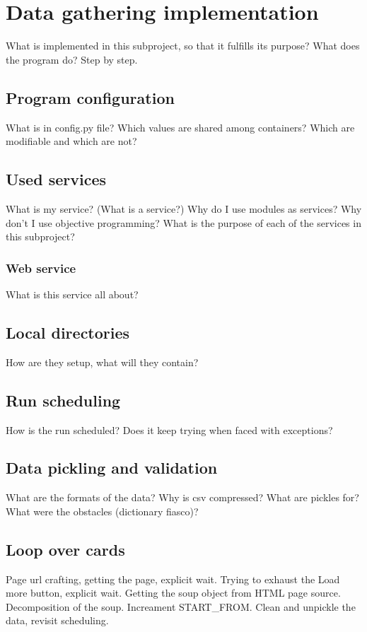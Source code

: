 \chapter{Data gathering implementation}
\label{ch:gathering}
What is implemented in this subproject, so that it fulfills its purpose?
What does the program do? Step by step.


\section{Program configuration}
What is in config.py file?
Which values are shared among containers?
Which are modifiable and which are not?


\section{Used services}
What is my service? (What is a service?)
Why do I use modules as services?
Why don't I use objective programming?
What is the purpose of each of the services in this subproject?

\subsection{Web service}
What is this service all about?


\section{Local directories}
How are they setup, what will they contain?


\section{Run scheduling}
How is the run scheduled?
Does it keep trying when faced with exceptions?


\section{Data pickling and validation}
What are the formats of the data? Why is csv compressed?
What are pickles for? What were the obstacles (dictionary fiasco)?


\section{Loop over cards}
Page url crafting, getting the page, explicit wait.
Trying to exhaust the Load more button, explicit wait.
Getting the soup object from HTML page source.
Decomposition of the soup. Increament START\_FROM.
Clean and unpickle the data, revisit scheduling.


